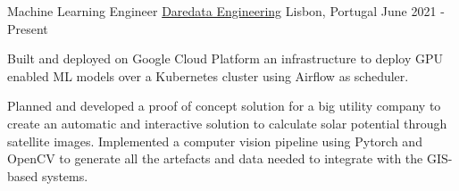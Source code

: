 

\begin{cventries}

  \cventry
    {Machine Learning Engineer} %
    {\href{https://daredata.engineering/home}{Daredata Engineering}} %
    {Lisbon, Portugal} %
    {June 2021 - Present} %
    {
      \begin{cvitems} %
        \item {Built and deployed on Google Cloud Platform an infrastructure to deploy GPU enabled ML models over a Kubernetes cluster using Airflow as scheduler.}
        \item {Planned and developed a proof of concept solution for a big utility company to create an automatic and interactive solution to calculate solar potential through satellite images. Implemented a computer vision pipeline using Pytorch and OpenCV to generate all the artefacts and data needed to integrate with the GIS-based systems.}
      \end{cvitems}
    }


\end{cventries}

